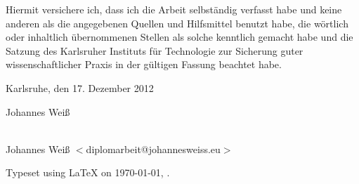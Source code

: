 \cleardoublepage{}

\setcounter{page}{1}

\vspace*{\fill}


\bigskip{}

\noindent{}Hiermit versichere ich, dass ich die Arbeit selbst\"andig verfasst
habe und keine anderen als die angegebenen Quellen und Hilfsmittel benutzt habe,
die w\"ortlich oder inhaltlich \"ubernommenen Stellen als solche kenntlich
gemacht habe und die Satzung des Karlsruher Instituts f\"ur Technologie zur
Sicherung guter wissenschaftlicher Praxis in der g\"ultigen Fassung beachtet
habe.

\bigskip{}

Karlsruhe, den 17. Dezember 2012 

\bigskip{}

\bigskip{}

\bigskip{}

Johannes Wei\ss

\vspace*{\fill}

\cleardoublepage

\vspace*{\fill}
\begin{center}
{\Large \JWtitle{}} \\
Johannes Wei\ss{} $<$diplomarbeit@johannesweiss.eu$>$
\end{center}
\vspace*{\fill}

\newpage

\null
\vfill
\hfill Typeset using \LaTeX{} on \today{}, \currenttime{}.


